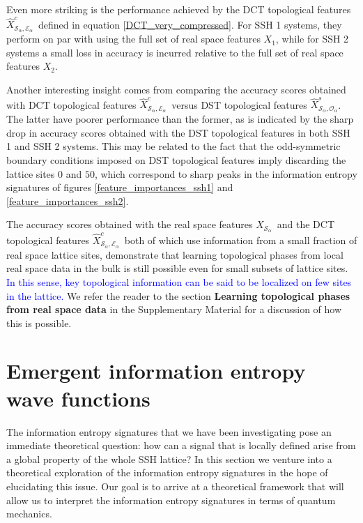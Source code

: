 \documentclass[10pt]{revtex4-1}
\newcommand\xOne{$X_1$}
\newcommand\xTwo{$X_2$}
\newcommand\xSalpha{$X_{\mathcal{S}_\alpha}$}
\newcommand\xcSEalpha{$\hat{X}^c_{\mathcal{S}_\alpha,\mathcal{E}_\alpha}$}
\newcommand\xsSOalpha{$\hat{X}^s_{\mathcal{S}_\alpha,\mathcal{O}_\alpha}$}
\begin{document}
Even more striking is the performance achieved by the DCT topological features \xcSEalpha\ defined in equation \eqref{DCT_very_compressed}. For SSH 1 systems, they perform on par with using the full set of real space features \xOne, while for SSH 2 systems a small loss in accuracy is incurred relative to the full set of real space features \xTwo.

Another interesting insight comes from comparing the accuracy scores obtained with DCT topological features \xcSEalpha\ versus DST topological features \xsSOalpha. The latter have poorer performance than the former, as is indicated by the sharp drop in accuracy scores obtained with the DST topological features in both SSH 1 and SSH 2 systems. This may be related to the fact that the odd-symmetric boundary conditions imposed on DST topological features imply discarding the lattice sites 0 and $50$, which correspond to sharp peaks in the information entropy signatures of figures \ref{feature_importances_ssh1} and \ref{feature_importances_ssh2}.  

The accuracy scores obtained with the real space features \xSalpha\ and the DCT topological features \xcSEalpha\, both of which use information from a small fraction of real space lattice sites, demonstrate that learning topological phases from local real space data in the bulk is still possible even for small subsets of lattice sites. \textcolor{blue}{In this sense, key topological information can be said to be localized on few sites in the lattice.} We refer the reader to the section \textbf{Learning topological phases from real space data} in the Supplementary Material for a discussion of how this is possible.       

\section{Emergent information entropy wave functions}
\label{emergent_information_entropy_wave_functions}

The information entropy signatures that we have been investigating pose an immediate theoretical question: how can a signal that is locally defined arise from a global property of the whole SSH lattice?    
In this section we venture into a theoretical exploration of the information entropy signatures in the hope of elucidating this issue. Our goal is to arrive at a theoretical framework that will allow us to interpret the information entropy signatures in terms of quantum mechanics.  %
\end{document}
